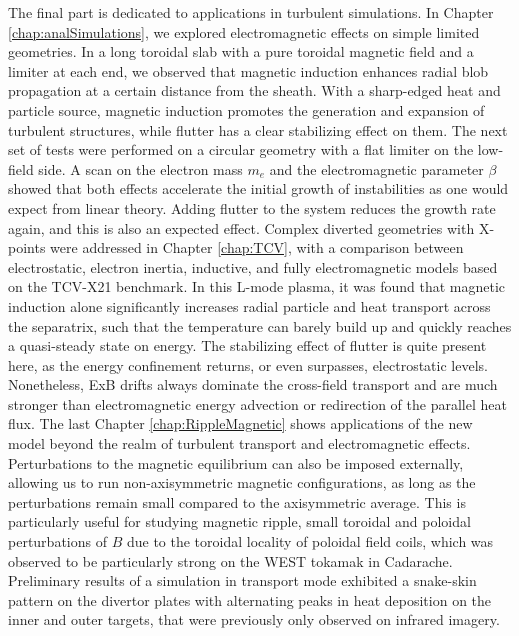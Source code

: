 The final part is dedicated to applications in turbulent simulations. In Chapter \ref{chap:analSimulations}, we explored electromagnetic effects on simple limited geometries. In a long toroidal slab with a pure toroidal magnetic field and a limiter at each end, we observed that magnetic induction enhances radial blob propagation at a certain distance from the sheath. With a sharp-edged heat and particle source, magnetic induction promotes the generation and expansion of turbulent structures, while flutter has a clear stabilizing effect on them. The next set of tests were performed on a circular geometry with a flat limiter on the low-field side. A scan on the electron mass $m_e$ and the electromagnetic parameter $\beta$ showed that both effects accelerate the initial growth of instabilities as one would expect from linear theory. Adding flutter to the system reduces the growth rate again, and this is also an expected effect. Complex diverted geometries with X-points were addressed in Chapter \ref{chap:TCV}, with a comparison between electrostatic, electron inertia, inductive, and fully electromagnetic models based on the TCV-X21 benchmark. In this L-mode plasma, it was found that magnetic induction alone significantly increases radial particle and heat transport across the separatrix, such that the temperature can barely build up and quickly reaches a quasi-steady state on energy. The stabilizing effect of flutter is quite present here, as the energy confinement returns, or even surpasses, electrostatic levels. Nonetheless, ExB drifts always dominate the cross-field transport and are much stronger than electromagnetic energy advection or redirection of the parallel heat flux. The last Chapter \ref{chap:RippleMagnetic} shows applications of the new model beyond the realm of turbulent transport and electromagnetic effects. Perturbations to the magnetic equilibrium can also be imposed externally, allowing us to run non-axisymmetric magnetic configurations, as long as the perturbations remain small compared to the axisymmetric average. This is particularly useful for studying magnetic ripple, small toroidal and poloidal perturbations of $B$ due to the toroidal locality of poloidal field coils, which was observed to be particularly strong on the WEST tokamak in Cadarache. Preliminary results of a simulation in transport mode exhibited a snake-skin pattern on the divertor plates with alternating peaks in heat deposition on the inner and outer targets, that were previously only observed on infrared imagery. \\


